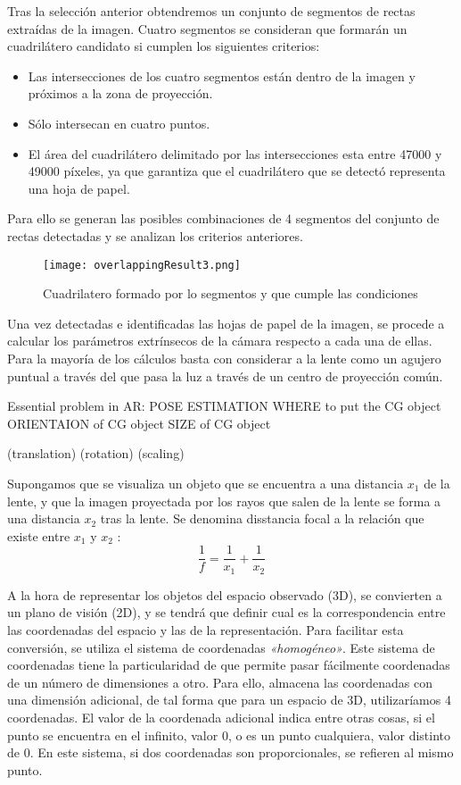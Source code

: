 Tras la selección anterior obtendremos un conjunto de segmentos de rectas extraídas de la
imagen. Cuatro segmentos se consideran que formarán un cuadrilátero candidato si cumplen los
siguientes criterios:
\begin{itemize}
\item Las intersecciones de los cuatro segmentos están dentro de la imagen y próximos a la zona de
  proyección.
\item Sólo intersecan en cuatro puntos.
\item El área del cuadrilátero delimitado por las intersecciones esta entre 47000 y 49000 píxeles,
  ya que garantiza que el cuadrilátero que se detectó representa una hoja de papel.
\end{itemize}

Para ello se generan las posibles combinaciones de 4 segmentos del conjunto de rectas detectadas y
se analizan los criterios anteriores.
\begin{figure}[h!] 
    \centering
    \texttt{[image: overlappingResult3.png]}
    \caption{Cuadrilatero formado por lo segmentos y que cumple las condiciones}
    \label{fig:overlappingResult}
  \end{figure}

Una vez detectadas e identificadas las hojas de papel de la imagen, se procede a calcular los parámetros extrínsecos de la cámara respecto a cada una de ellas. Para la mayoría de los cálculos basta con considerar a la lente como un agujero puntual a través del que pasa la luz a través de un centro de proyección común.

Essential problem in AR: POSE ESTIMATION
WHERE to put the CG object
ORIENTAION of CG object
SIZE of CG object

(translation)
(rotation)
(scaling)

Supongamos que se visualiza un objeto que se encuentra a una distancia $x_{1}$ de la lente, y que la
imagen proyectada por los rayos que salen de la lente se forma a una distancia $x_{2}$ tras la
lente. Se denomina disstancia focal a la relación que existe entre $x_{1}$ y $x_{2}$ :
\begin{equation}
\dfrac{1}{f} = \dfrac{1}{x_{1}} + \dfrac{1}{x_{2}}
\end{equation}

A la hora de representar los objetos del espacio observado (3D), se convierten a un plano de
visión (2D), y se tendrá que definir cual es la correspondencia entre las coordenadas del espacio y las de la representación. Para facilitar esta conversión, se utiliza el sistema de coordenadas \emph{«homogéneo»}. Este sistema de coordenadas tiene la particularidad de que permite pasar fácilmente coordenadas de un número de dimensiones a otro. Para ello, almacena las coordenadas con una dimensión adicional, de tal forma que para un espacio de 3D, utilizaríamos 4 coordenadas. El valor de la coordenada adicional indica entre otras cosas, si el punto se encuentra en el infinito, valor 0, o es un punto cualquiera, valor distinto de 0. En este sistema, si dos coordenadas son proporcionales, se refieren al mismo punto.

